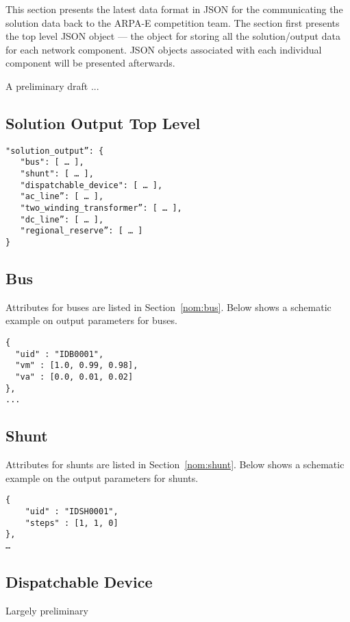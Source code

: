 \label{sec:solution_format}
This section presents the latest data format in JSON for the 
communicating the solution data back to the ARPA-E competition team.
The section first presents the top level JSON object --- the
object for storing all the solution/output data 
for each network component.
JSON objects associated with each individual component will be presented afterwards.

\begin{todo}[]{}
A preliminary draft ...
\end{todo}

\subsection{Solution Output Top Level}
\label{sec:output_data}

\begin{verbatim}
"solution_output”: {
   "bus": [ … ],
   "shunt": [ … ],
   "dispatchable_device": [ … ],
   "ac_line”: [ … ],
   "two_winding_transformer”: [ … ],
   "dc_line”: [ … ],   
   "regional_reserve”: [ … ]
}    
\end{verbatim}

\subsection{Bus}
Attributes for buses are listed in Section~\ref{nom:bus}.
Below shows a schematic example on output parameters for buses.
\begin{verbatim}
{
  "uid" : "IDB0001",
  "vm" : [1.0, 0.99, 0.98],
  "va" : [0.0, 0.01, 0.02]
},
...
\end{verbatim}

\subsection{Shunt}
Attributes for shunts are listed in Section~\ref{nom:shunt}.
Below shows a schematic example on the output parameters for shunts.
\begin{verbatim}
{
    "uid" : "IDSH0001",
    "steps" : [1, 1, 0]
},
…    
\end{verbatim}

\subsection{Dispatchable Device}
\begin{todo}[]{}
Largely preliminary
\end{todo}

